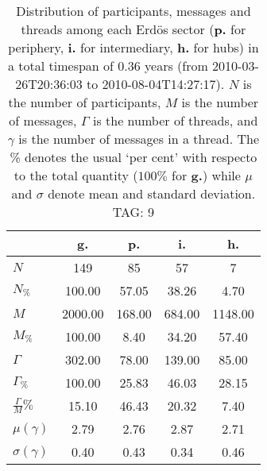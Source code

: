 \begin{table}[h!]
\begin{center}
\begin{tabular}{| l | c | c | c | c |}\hline
 & g. & p. & i. & h. \\\hline
$N$ & 149  & 85  & 57  & 7 \\\hline
$N_{\%}$ & 100.00  & 57.05  & 38.26  & 4.70 \\\hline
$M$ & 2000.00  & 168.00  & 684.00  & 1148.00 \\\hline
$M_{\%}$ & 100.00  & 8.40  & 34.20  & 57.40 \\\hline
$\Gamma$ & 302.00  & 78.00  & 139.00  & 85.00 \\\hline
$\Gamma_{\%}$ & 100.00  & 25.83  & 46.03  & 28.15 \\\hline
$\frac{\Gamma}{M}\%$ & 15.10  & 46.43  & 20.32  & 7.40 \\\hline
$\mu(\gamma)$ & 2.79  & 2.76  & 2.87  & 2.71 \\\hline
$\sigma(\gamma)$ & 0.40  & 0.43  & 0.34  & 0.46 \\\hline
\end{tabular}
\caption{Distribution of participants, messages and threads among each Erd\"os sector ({\bf p.} for periphery, {\bf i.} for intermediary, 
    {\bf h.} for hubs) in a total timespan of 0.36 years (from 2010-03-26T20:36:03 to 2010-08-04T14:27:17). $N$ is the number of participants, $M$ is the number of messages, $\Gamma$ is the number of threads, and $\gamma$ is the number of messages in a thread.
    The \% denotes the usual `per cent' with respecto to the total quantity ($100\%$ for {\bf g.})
    while $\mu$ and $\sigma$ denote mean and standard deviation. TAG: 9}
\end{center}
\end{table}